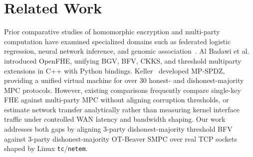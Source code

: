 \documentclass[conference]{IEEEtran}
\begin{document}
\section{Related Work}
Prior comparative studies of homomorphic encryption and multi-party computation have examined specialized domains such as federated logistic regression, neural network inference, and genomic association~\cite{openfhe2022,mpspdz2020,mouchet2021}. Al Badawi et al.~\cite{openfhe2022} introduced OpenFHE, unifying BGV, BFV, CKKS, and threshold multiparty extensions in C++ with Python bindings. Keller~\cite{mpspdz2020} developed MP-SPDZ, providing a unified virtual machine for over 30 honest- and dishonest-majority MPC protocols. However, existing comparisons frequently compare single-key FHE against multi-party MPC without aligning corruption thresholds, or estimate network transfer analytically rather than measuring kernel interface traffic under controlled WAN latency and bandwidth shaping. Our work addresses both gaps by aligning 3-party dishonest-majority threshold BFV against 3-party dishonest-majority OT-Beaver SMPC over real TCP sockets shaped by Linux \texttt{tc}/\texttt{netem}.
\end{document}
